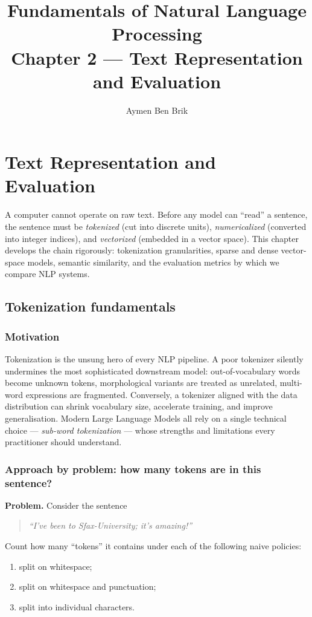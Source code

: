 \documentclass[12pt,a4paper]{report}
\title{Fundamentals of Natural Language Processing\\[0.3cm] \large Chapter 2 --- Text Representation and Evaluation}
\author{Aymen Ben Brik}
\date{}
\theoremstyle{definition}
\theoremstyle{remark}
\begin{document}
\maketitle

\setcounter{chapter}{1}
\chapter{Text Representation and Evaluation}

A computer cannot operate on raw text. Before any model can ``read'' a sentence, the sentence must be \emph{tokenized} (cut into discrete units), \emph{numericalized} (converted into integer indices), and \emph{vectorized} (embedded in a vector space). This chapter develops the chain rigorously: tokenization granularities, sparse and dense vector-space models, semantic similarity, and the evaluation metrics by which we compare NLP systems.

\section{Tokenization fundamentals}

\subsection{Motivation}
Tokenization is the unsung hero of every NLP pipeline. A poor tokenizer silently undermines the most sophisticated downstream model: out-of-vocabulary words become unknown tokens, morphological variants are treated as unrelated, multi-word expressions are fragmented. Conversely, a tokenizer aligned with the data distribution can shrink vocabulary size, accelerate training, and improve generalisation. Modern Large Language Models all rely on a single technical choice --- \emph{sub-word tokenization} --- whose strengths and limitations every practitioner should understand.

\subsection{Approach by problem: how many tokens are in this sentence?}
\textbf{Problem.} Consider the sentence
\begin{quote}
\emph{``I've been to Sfax-University; it's amazing!''}
\end{quote}
Count how many ``tokens'' it contains under each of the following naive policies:
\begin{enumerate}
    \item split on whitespace;
    \item split on whitespace and punctuation;
    \item split into individual characters.
\end{enumerate}
\end{document}
